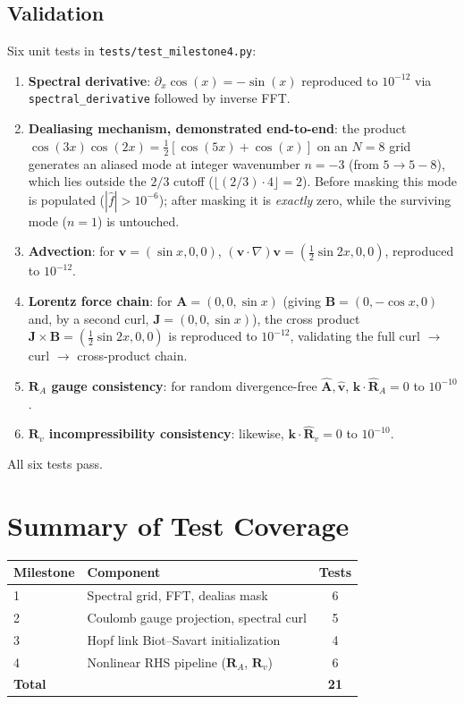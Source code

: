 \documentclass[11pt, a4paper]{article}
\begin{document}
\subsection{Validation}

Six unit tests in \texttt{tests/test\_milestone4.py}:
\begin{enumerate}
    \item \textbf{Spectral derivative}: $\partial_x \cos(x) = -\sin(x)$
    reproduced to $10^{-12}$ via \texttt{spectral\_derivative} followed by
    inverse FFT.
    \item \textbf{Dealiasing mechanism, demonstrated end-to-end}: the
    product $\cos(3x)\cos(2x) = \tfrac{1}{2}[\cos(5x)+\cos(x)]$ on an
    $N=8$ grid generates an aliased mode at integer wavenumber $n=-3$
    (from $5 \to 5-8$), which lies outside the $2/3$ cutoff
    ($\lfloor(2/3)\cdot 4\rfloor=2$). Before masking this mode is
    populated ($|\hat{f}|>10^{-6}$); after masking it is \emph{exactly}
    zero, while the surviving mode ($n=1$) is untouched.
    \item \textbf{Advection}: for $\mathbf{v}=(\sin x, 0, 0)$,
    $(\mathbf{v}\cdot\nabla)\mathbf{v} = (\tfrac{1}{2}\sin 2x, 0, 0)$,
    reproduced to $10^{-12}$.
    \item \textbf{Lorentz force chain}: for $\mathbf{A}=(0,0,\sin x)$
    (giving $\mathbf{B}=(0,-\cos x,0)$ and, by a second curl,
    $\mathbf{J}=(0,0,\sin x)$), the cross product
    $\mathbf{J}\times\mathbf{B} = (\tfrac{1}{2}\sin 2x, 0, 0)$ is
    reproduced to $10^{-12}$, validating the full curl
    $\to$ curl $\to$ cross-product chain.
    \item \textbf{$\mathbf{R}_A$ gauge consistency}: for random
    divergence-free $\hat{\mathbf{A}}, \hat{\mathbf{v}}$,
    $\mathbf{k}\cdot\hat{\mathbf{R}}_A = 0$ to $10^{-10}$.
    \item \textbf{$\mathbf{R}_v$ incompressibility consistency}: likewise,
    $\mathbf{k}\cdot\hat{\mathbf{R}}_v = 0$ to $10^{-10}$.
\end{enumerate}
All six tests pass.

\section{Summary of Test Coverage}

\begin{table}[h]
\centering
\begin{tabular}{@{}llc@{}}
\toprule
Milestone & Component & Tests \\
\midrule
1 & Spectral grid, FFT, dealias mask & 6 \\
2 & Coulomb gauge projection, spectral curl & 5 \\
3 & Hopf link Biot--Savart initialization & 4 \\
4 & Nonlinear RHS pipeline ($\mathbf{R}_A$, $\mathbf{R}_v$) & 6 \\
\midrule
\textbf{Total} & & \textbf{21} \\
\bottomrule
\end{tabular}
\end{table}
\end{document}
